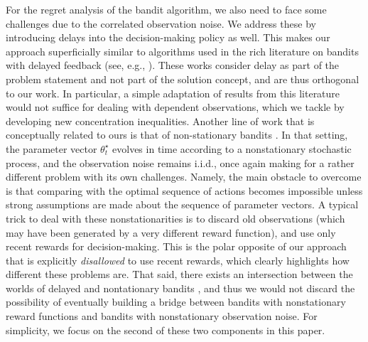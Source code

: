 For the regret analysis of the bandit algorithm, we also need to face some challenges due to the correlated 
observation noise. We address these by introducing delays into the decision-making policy as well.
This makes our approach superficially similar to algorithms used in the rich literature on bandits with delayed feedback
(see, e.g., \citealp{vernade2020linear,howson2023delayed}). These works consider delay as part of the problem statement 
and not part of the solution concept, and are thus orthogonal to our work. In particular, a simple adaptation of 
results from this literature would not suffice for dealing with dependent observations, which we tackle by developing 
new concentration inequalities. Another line of work that is conceptually related to ours is that of non-stationary 
bandits \citep{garivier2008upper,russac2019weighted}. In that setting, the parameter vector $\theta^\star_t$ evolves in 
time according to a nonstationary stochastic process, and the observation noise remains i.i.d., once again making for a 
rather different problem with its own challenges. Namely, the main obstacle to overcome is that comparing with the 
optimal sequence of actions becomes impossible unless strong assumptions are made about the sequence of 
parameter vectors. A typical trick to deal with these nonstationarities is to discard old observations (which may have 
been generated by a very different reward function), and use only recent rewards for decision-making. This is the polar 
opposite of our approach that is explicitly \emph{disallowed} to use recent rewards, which clearly highlights how 
different these problems are. That said, there exists an intersection between the worlds of delayed and nontationary 
bandits \citep{vernade2020non}, and thus we would not discard the possibility of eventually building a bridge between 
bandits with nonstationary reward functions and bandits with nonstationary observation noise. For simplicity, we focus 
on the second of these two components in this paper.

% 







